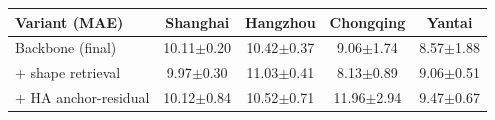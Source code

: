 \begin{tabular}{lcccc}
\toprule
Variant (MAE) & Shanghai & Hangzhou & Chongqing & Yantai \\
\midrule
Backbone (final) & 10.11$\pm$0.20 & 10.42$\pm$0.37 & 9.06$\pm$1.74 & 8.57$\pm$1.88 \\
+ shape retrieval & 9.97$\pm$0.30 & 11.03$\pm$0.41 & 8.13$\pm$0.89 & 9.06$\pm$0.51 \\
+ HA anchor-residual & 10.12$\pm$0.84 & 10.52$\pm$0.71 & 11.96$\pm$2.94 & 9.47$\pm$0.67 \\
\bottomrule
\end{tabular}
